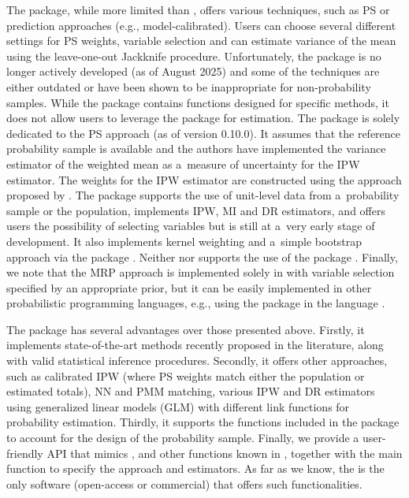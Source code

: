 \documentclass[nojss]{jss}
\begin{document}
The  package, while more limited than ,
offers various techniques, such as PS or prediction approaches (e.g.,
model-calibrated). Users can choose several different settings for PS
weights, variable selection and can estimate variance of the mean using
the leave-one-out Jackknife procedure. Unfortunately, the package is no
longer actively developed (as of August 2025) and some of the techniques
are either outdated or have been shown to be inappropriate for
non-probability samples. While the package contains functions designed
for specific methods, it does not allow users to leverage the
 package \citep{survey-pkg} for estimation. The
 package is solely dedicated to the PS approach (as of
version 0.10.0). It assumes that the reference probability sample is
available and the authors have implemented the variance estimator of the
weighted mean as a~measure of uncertainty for the IPW estimator. The
weights for the IPW estimator are constructed using the approach
proposed by \citet{Schonlau2017}. The  package supports the
use of unit-level data from a~probability sample or the population,
implements IPW, MI and DR estimators, and offers users the possibility
of selecting variables but is still at a~very early stage of
development. It also implements kernel weighting and a~simple bootstrap
approach via the  package \citep{scipy2020}. Neither
 nor  supports the use of the 
package \citep{Diallo2021}. Finally, we note that the MRP approach is
implemented solely in  with variable selection specified
by an appropriate prior, but it can be easily implemented in other
probabilistic programming languages, e.g., using the 
package \citep{turing} in the  language \citep{julia}.

The  package has several advantages over those presented
above. Firstly, it implements state-of-the-art methods recently proposed
in the literature, along with valid statistical inference procedures.
Secondly, it offers other approaches, such as calibrated IPW (where PS
weights match either the population or estimated totals), NN and PMM
matching, various IPW and DR estimators using generalized linear models
(GLM) with different link functions for probability estimation. Thirdly,
it supports the functions included in the  package to
account for the design of the probability sample. Finally, we provide a
user-friendly API that mimics , 
and other functions known in , together with the main
function to specify the approach and estimators. As far as we know, the
 is the only software (open-access or commercial) that
offers such functionalities.
\end{document}
